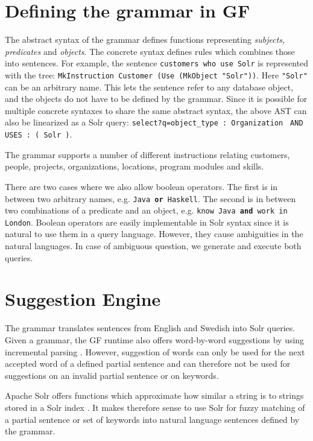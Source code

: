 \documentclass[10pt, a4paper]{article}
\begin{document}
\section{Defining the grammar in GF}
The abstract syntax of the grammar defines functions representing
\emph{subjects, predicates} and \emph{objects}. The concrete
syntax defines rules which combines those into sentences. 
For example, the sentence \texttt{customers who use Solr} is represented
with the tree: 
\newline
\texttt{MkInstruction Customer (Use (MkObject "Solr"))}.
Here \texttt{"Solr"} can be an arbitrary name. This lets the sentence
refer to any database object, and the objects do not have to be defined by the grammar.
Since it is possible for multiple concrete syntaxes to share the
same abstract syntax, the above AST can also be linearized as
a Solr query:
\newline
\texttt{select?q=object\_type : Organization }
\hspace*{5.4cc}\texttt{AND USES : ( Solr )}.

The grammar supports a number of different instructions relating customers, 
people, projects, organizations, locations, program modules and skills.

There are two cases where we also allow boolean operators. 
The first is in between two arbitrary names, e.g. 
\texttt{Java \textbf{or} Haskell}. The second is in between 
two combinations of a predicate and an object, 
e.g. \texttt{know Java \textbf{and} work in London}. Boolean operators 
are easily implementable in Solr syntax since it is natural to use them
in a query language. However, they cause ambiguities in the natural languages.
In case of ambiguous question, we generate and execute both queries.

\section{Suggestion Engine}
The grammar translates sentences from English and Swedish into Solr queries.
Given a grammar, the GF runtime also offers word-by-word suggestions 
by using incremental parsing \cite{angelov:2009}. However, suggestion of 
words can only be used for the next accepted word of 
a defined partial sentence and can therefore not be used for suggestions
on an invalid partial sentence or on keywords.

Apache Solr offers functions which approximate how similar a string 
is to strings stored in a Solr index \cite{kuc:2011}. 
It makes therefore sense to use Solr for fuzzy matching of 
a partial sentence or set of keywords into natural language sentences
defined by the grammar.
\end{document}
